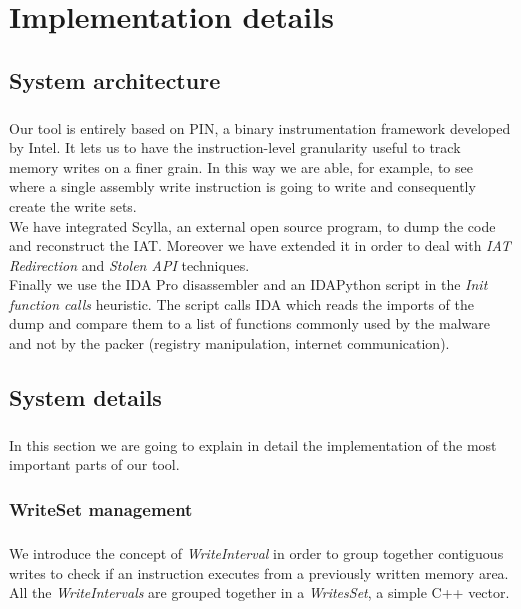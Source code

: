 \chapter{Implementation details}
\label{chapter4}
\thispagestyle{empty}

\section{System architecture}
\paragraph{}
Our tool is entirely based on PIN, a binary instrumentation framework developed by Intel. It lets us to have the instruction-level granularity useful to track memory writes on a finer grain. In this way we are able, for example, to see where a single assembly write instruction is going to write and consequently create the write sets.\\
We have integrated Scylla, an external open source program, to dump the code and reconstruct the \ac{IAT}. Moreover we have extended it in order to deal with \textit{\ac{IAT} Redirection} and \textit{Stolen \ac{API}} techniques.\\
Finally we use the IDA Pro disassembler and an IDAPython script in the \textit{Init function calls} heuristic. The script calls IDA which reads the imports of the dump and compare them to a list of functions commonly used by the malware and not by the packer (registry manipulation, internet communication).

\section{System details}
\paragraph{}
In this section we are going to explain in detail the implementation of the most important parts of our tool.

\subsection{WriteSet management}
\paragraph{}
We introduce the concept of \textit{WriteInterval} in order to group together contiguous writes to check if an instruction executes from a previously written memory area. All the \textit{WriteIntervals} are grouped together in a \textit{WritesSet}, a simple C++ vector.\\
